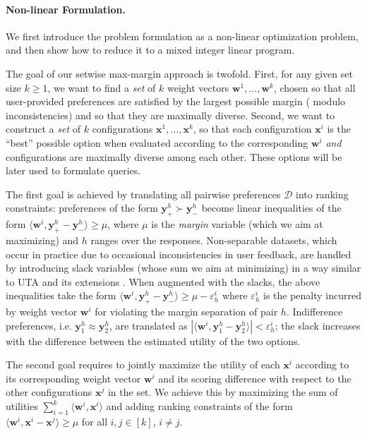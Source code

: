 \documentclass{article}
\renewcommand\[{\begin{equation}}
\renewcommand\]{\end{equation}}
\newcommand{\calvar}[1]{\ensuremath{\mathcal{#1}}}
\newcommand{\calD}{\calvar{D}}
\newcommand{\vecvar}[1]{\ensuremath{\boldsymbol{#1}}}
\newcommand{\vw}{\vecvar{w}}
\newcommand{\vx}{\vecvar{x}}
\newcommand{\vy}{\vecvar{y}}
\begin{document}
\paragraph{Non-linear Formulation.} We first introduce the problem
formulation as a %
non-linear optimization problem, and
then show how to reduce it to a mixed integer linear program.%

The goal of our setwise max-margin approach is twofold. First, for any
given set size $k\geq 1$, we want to find a {\em set} of $k$ weight
vectors $\vw^{1}, \ldots, \vw^{k}$, chosen so that all user-provided
preferences are satisfied by the largest possible margin (%
modulo inconsistencies) and so that they are maximally
diverse.  Second, we want to construct a {\em set} of $k$
configurations $\vx^{1}, \ldots, \vx^{k}$, so that each configuration
$\vx^{i}$ is the ``best'' possible option when evaluated according to
the corresponding $\vw^{i}$ {\em and} configurations are maximally diverse
among each other. These options will be later used to formulate
queries.

The first goal is achieved by translating all pairwise preferences
$\calD$ into ranking constraints: preferences of the form
$\vy^h_+ \succ \vy^h_-$ become linear inequalities of the form
$\langle \vw^i, \vy^h_+ - \vy^h_- \rangle \geq \mu$, where $\mu$ is the
{\em margin} variable (which we aim at maximizing) and $h$ ranges over
the responses.  Non-separable datasets, which occur in practice due to
occasional inconsistencies in user feedback, are handled by
introducing slack variables (whose sum we aim at minimizing)
in a way similar to UTA and its extensions \cite{jaquetlsiskos1982,greco2008ordinal}. When
augmented with the slacks, the above inequalities take the form
$\langle \vw^{i}, \vy^{h}_+ - \vy^{h}_- \rangle \ge \mu - \varepsilon^{i}_h$
where $\varepsilon^{i}_h$ is the penalty incurred by weight vector $\vw^{i}$
for violating the margin separation of pair $h$. Indifference preferences, i.e.
$\vy^h_1 \approx \vy^h_2$, are translated as $|\langle \vw^i, \vy^h_1 - \vy^h_2 \rangle| < \varepsilon^i_h$;
the slack increases with the difference between the estimated utility of the
two options.

The second goal requires to jointly maximize the utility of each
$\vx^{i}$ according to its corresponding weight vector $\vw^i$ and its
scoring difference with respect to the other configurations $\vx^j$ in
the set. We achieve this by maximizing the sum of utilities
$\sum_{i=1}^k \langle \vw^{i}, \vx^{i} \rangle$ and adding ranking
constraints of the form
$\langle \vw^{i}, \vx^{i} - \vx^{j} \rangle \geq \mu$ for all
$i,j\in[k]$, $i \ne j$.
\end{document}
